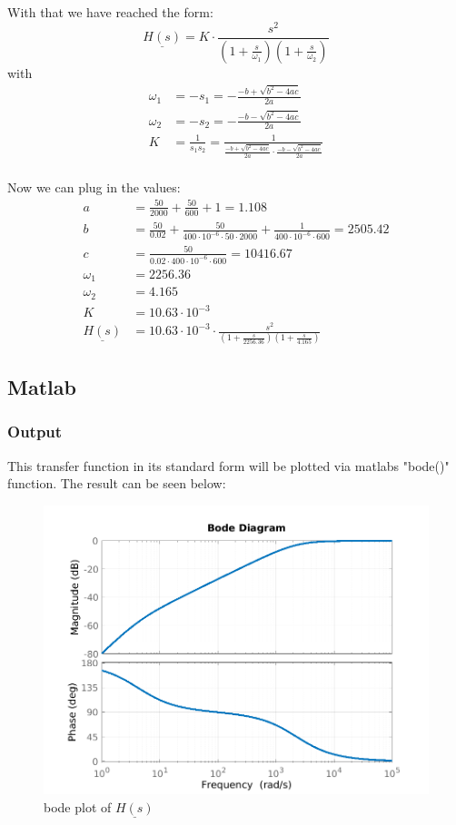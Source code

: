 \documentclass[a4paper]{article}
\begin{document}
With that we have reached the form:
\begin{equation*}
	\underline{H(s)} = K\cdot \frac{s^2}{\left(1+\frac{s}{\omega_1}\right)\left(1+\frac{s}{\omega_2}\right)}
\end{equation*}
with
\begin{align*}
	\omega_1 &= -s_1 = -\frac{-b + \sqrt{b^2 - 4ac}}{2a}\\
	\omega_2 &= -s_2 = -\frac{-b - \sqrt{b^2 - 4ac}}{2a}\\
	K &= \frac{1}{s_1s_2} = \frac{1}{\frac{-b + \sqrt{b^2 - 4ac}}{2a} \cdot \frac{-b - \sqrt{b^2 - 4ac}}{2a}}\\
\end{align*}

\pagebreak

Now we can plug in the values:
\begin{align*}
	a &= \frac{50}{2000} + \frac{50}{600} + 1 = 1.108\\
	b &= \frac{50}{0.02} + \frac{50}{400\cdot 10^{-6} \cdot 50 \cdot 2000} + \frac{1}{400\cdot 10^{-6} \cdot 600} = 2505.42\\
	c &= \frac{50}{0.02 \cdot  400\cdot 10^{-6} \cdot 600} = 10416.67\\
	\omega_1 &= 2256.36\\
	\omega_2 &= 4.165\\
	K &= 10.63 \cdot 10^{-3}\\
	\underline{H(s)} &= 10.63 \cdot 10^{-3} \cdot \frac{s^2}{\left(1+\frac{s}{2256.36}\right)\left(1+\frac{s}{4.165}\right)}
\end{align*}
\subsection{Matlab} 
\subsubsection{Output}
This transfer function in its standard form will be plotted via matlabs "bode()" function.
The result can be seen below: 
\begin{figure}[ht] \centering
  \includegraphics{./Figures/ue9_plot.png}
  \caption{bode plot of $\underline{H(s)}$}
  \label{fig:matl}
\end{figure}
\end{document}
